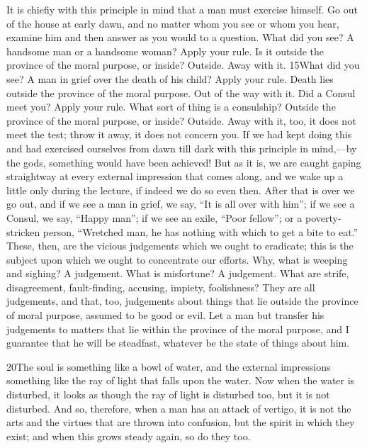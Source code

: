 It is chiefiy with this principle in mind that a man must exercise himself. Go out of the house at early dawn, and no matter whom you see or whom you hear, examine him and then answer as you would to a question. What did you see? A handsome man or a handsome woman? Apply your rule. Is it outside the province of the moral purpose, or inside? Outside. Away with it. 15What did you see? A man in grief over the death of his child? Apply your rule. Death lies outside the province of the moral purpose. Out of the way with it. Did a Consul meet you? Apply your rule. What sort of thing is a consulship? Outside the province of the moral purpose, or inside? Outside. Away with it, too, it does not meet the test; throw it away, it does not concern you. If we had kept doing this and had exercised ourselves from dawn till dark with this principle in mind,—by the gods, something would have been achieved! But as it is, we are caught gaping straightway at every external impression that comes along, and we wake up a little only during the lecture, if indeed we do so even then. After that is over we go out, and if we see a man in grief, we say, ``It is all over with him''; if we see a Consul, we say, ``Happy man''; if we see an exile, ``Poor fellow''; or a poverty-stricken person, ``Wretched man, he has nothing with which to get a bite to eat.'' These, then, are the vicious judgements which we ought to eradicate; this is the subject upon which we ought to concentrate our efforts. Why, what is weeping and sighing? A judgement. What is misfortune? A judgement. What are strife, disagreement, fault-finding, accusing, impiety, foolishness? They are all judgements, and that, too, judgements about things that lie outside the province of moral purpose, assumed to be good or evil. Let a man but transfer his judgements to matters that lie within the province of the moral purpose, and I guarantee that he will be steadfast, whatever be the state of things about him.

20The soul is something like a bowl of water, and the external impressions something like the ray of light that falls upon the water. Now when the water is disturbed, it looks as though the ray of light is disturbed too, but it is not disturbed. And so, therefore, when a man has an attack of vertigo, it is not the arts and the virtues that are thrown into confusion, but the spirit in which they exist; and when this grows steady again, so do they too.



